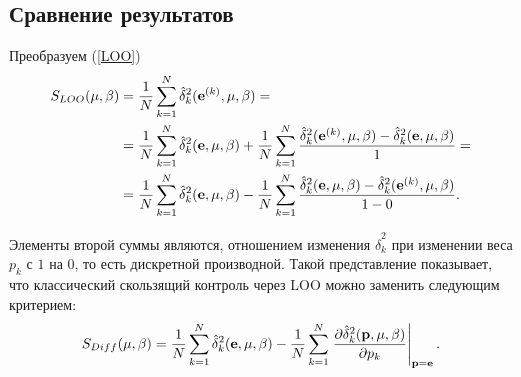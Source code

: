 




\subsection{Сравнение результатов} %
Преобразуем (\ref{LOO})
\begin{align*}
	S_{LOO}({\mu,\beta}) 
	&= \frac1N\sum\limits_{k=1}^N \hat{\delta}^2_k(\boldsymbol{\mathbf{e}}^{(k)}, {\mu,\beta}) = \\
	&= \frac1N\sum\limits_{k=1}^N \hat{\delta}_k^2(\boldsymbol{\mathbf{e}}, {\mu,\beta})
	+ \frac1N\sum\limits_{k=1}^N \frac{\hat{\delta}_k^2(\boldsymbol{\mathbf{e}}^{(k)}, {\mu,\beta}) - \hat{\delta}_k^2(\boldsymbol{\mathbf{e}}, {\mu,\beta})}1 = \\
	&= \frac1N\sum\limits_{k=1}^N \hat{\delta}_k^2(\boldsymbol{\mathbf{e}}, {\mu,\beta})
	- \frac1N\sum\limits_{k=1}^N \frac{\hat{\delta}_k^2(\boldsymbol{\mathbf{e}}, {\mu,\beta}) - \hat{\delta}_k^2(\boldsymbol{\mathbf{e}}^{(k)}, {\mu,\beta})}{1-0}.
\end{align*}

Элементы второй суммы являются, отношением изменения $\hat{\delta}_k^2$ при изменении веса $p_k$ с $1$ на $0$, то есть дискретной производной.
Такой представление показывает, что классический скользящий контроль через LOO можно заменить следующим критерием:
\begin{equation*}
	S_{Diff}({\mu,\beta}) 
	= \frac1N\sum\limits_{k=1}^N \hat{\delta}_k^2(\boldsymbol{\mathbf{e}}, {\mu,\beta}) 
	- \frac1N\sum\limits_{k=1}^N \left.
		\frac{\partial\hat{\delta}_k^2(\boldsymbol{\mathbf{p}}, {\mu,\beta})}{\partial p_k} 
	\right|_{\boldsymbol{\mathbf{p}}=\boldsymbol{\mathbf{e}}}.
\end{equation*}

